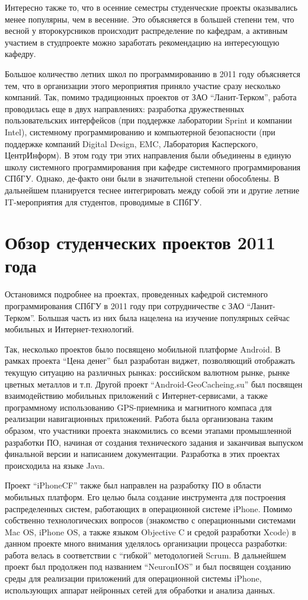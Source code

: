 \documentclass[a4paper]{article}
\begin{document}
Интересно также то, что в осенние семестры студенческие проекты оказывались менее популярны, чем в весенние. Это объясняется в большей степени тем, что весной у второкурсников происходит распределение по кафедрам, а активным участием в студпроекте можно заработать рекомендацию на интересующую кафедру. 

Большое количество летних школ по программированию в 2011 году объясняется тем, что в организации этого мероприятия приняло участие сразу несколько компаний. Так, помимо традиционных проектов от ЗАО ``Ланит-Терком'', работа проводилась еще в двух направлениях: разработка дружественных пользовательских интерфейсов (при поддержке лаборатории Sprint и компании Intel), системному программированию и компьютерной безопасности (при поддержке компаний Digital Design, EMC, Лаборатория Касперского, ЦентрИнформ). В этом году три этих направления были объединены в единую школу системного программирования при кафедре системного программирования СПбГУ. Однако, де-факто они были в значительной степени обособлены. В дальнейшем планируется теснее интегрировать между собой эти и другие летние IT-мероприятия для студентов, проводимые в СПбГУ.

\section{Обзор студенческих проектов 2011 года}

Остановимся подробнее на проектах, проведенных кафедрой системного программирования СПбГУ в 2011 году при сотрудничестве с ЗАО ``Ланит-Терком''. Большая часть из них была нацелена на изучение популярных сейчас мобильных и Интернет-технологий.

Так, несколько проектов было посвящено мобильной платформе Android. В рамках проекта ``Цена денег'' был разработан виджет, позволяющий отображать текущую ситуацию на различных рынках: российском валютном рынке, рынке цветных металлов и т.п. Другой проект ``Android-GeoCacheing.su'' был посвящен взаимодействию мобильных приложений с Интернет-сервисами, а также программному использованию GPS-приемника и магнитного компаса для реализации навигационных приложений. Работа была организована таким образом, что участники проекта знакомились со всеми этапами промышленной разработки ПО, начиная от создания технического задания и заканчивая выпуском финальной версии и написанием документации. Разработка в этих проектах происходила на языке Java. 

Проект ``iPhoneCF'' также был направлен на разработку ПО в области мобильных платформ. Его целью была создание инструмента для построения распределенных систем, работающих в операционной системе iPhone. Помимо собственно технологических вопросов (знакомство с операционными системами Mac OS, iPhone OS, а также языком Objective C и средой разработки Xcode) в данном проекте много внимания уделялось организации процесса разработки: работа велась в соответствии с ``гибкой'' методологией Scrum. В дальнейшем проект был продолжен под названием ``NeuronIOS'' и был посвящен созданию среды для реализации приложений для операционной системы iPhone, использующих аппарат нейронных сетей для обработки и анализа данных.
\end{document}
